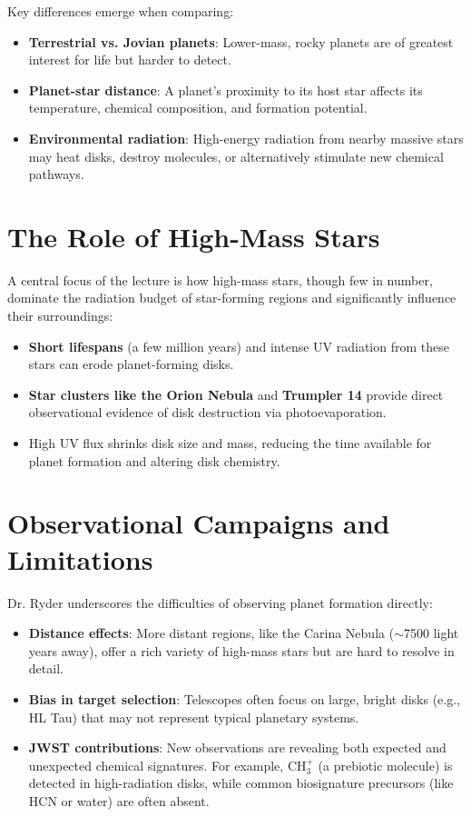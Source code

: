 \documentclass[12pt]{article}
\begin{document}
Key differences emerge when comparing:
\begin{itemize}
    \item \textbf{Terrestrial vs. Jovian planets}: Lower-mass, rocky planets are of greatest interest for life but harder to detect.
    \item \textbf{Planet-star distance}: A planet’s proximity to its host star affects its temperature, chemical composition, and formation potential.
    \item \textbf{Environmental radiation}: High-energy radiation from nearby massive stars may heat disks, destroy molecules, or alternatively stimulate new chemical pathways.
\end{itemize}

\section*{The Role of High-Mass Stars}
A central focus of the lecture is how high-mass stars, though few in number, dominate the radiation budget of star-forming regions and significantly influence their surroundings:
\begin{itemize}
    \item \textbf{Short lifespans} (a few million years) and intense UV radiation from these stars can erode planet-forming disks.
    \item \textbf{Star clusters like the Orion Nebula} and \textbf{Trumpler 14} provide direct observational evidence of disk destruction via photoevaporation.
    \item High UV flux shrinks disk size and mass, reducing the time available for planet formation and altering disk chemistry.
\end{itemize}

\section*{Observational Campaigns and Limitations}
Dr. Ryder underscores the difficulties of observing planet formation directly:
\begin{itemize}
    \item \textbf{Distance effects}: More distant regions, like the Carina Nebula ($\sim$7500 light years away), offer a rich variety of high-mass stars but are hard to resolve in detail.
    \item \textbf{Bias in target selection}: Telescopes often focus on large, bright disks (e.g., HL Tau) that may not represent typical planetary systems.
    \item \textbf{JWST contributions}: New observations are revealing both expected and unexpected chemical signatures. For example, CH$_3^+$ (a prebiotic molecule) is detected in high-radiation disks, while common biosignature precursors (like HCN or water) are often absent.
\end{itemize}
\end{document}
